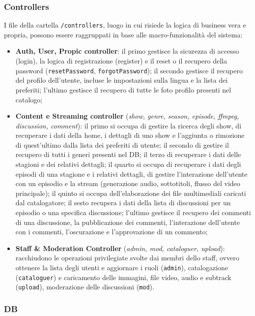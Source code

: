 \documentclass[11pt,a4paper]{article}
\begin{document}
\subsubsection{Controllers}
I file della cartella \texttt{/controllers}, luogo in cui risiede la logica di business vera e propria, possono essere raggruppati in base alle macro-funzionalità del sistema:
\begin{itemize}
    \item \textbf{Auth, User, Propic controller}: il primo gestisce la sicurezza di accesso (login), la logica di registrazione (register) e il reset o il recupero della password (\texttt{resetPassword}, \texttt{forgotPassword}); il secondo gestisce il recupero del profilo dell’utente, incluse le impostazioni sulla lingua e la lista dei preferiti; l’ultimo gestisce il recupero di tutte le foto profilo presenti nel catalogo;
    \item \textbf{Content e Streaming controller} (\textit{show, genre, season, episode, ffmpeg, discussion, comment}): il primo si occupa di gestire la ricerca degli show, di recuperare i dati della home, i dettagli di uno show e l’aggiunta o rimozione di quest’ultimo dalla lista dei preferiti di utente; il secondo di gestire il recupero di tutti i generi presenti nel DB; il terzo di recuperare i dati delle stagioni e dei relativi dettagli; il quarto si occupa di recuperare i dati degli episodi di una stagione e i relativi dettagli, di gestire l’interazione dell’utente con un episodio e la stream (generazione audio, sottotitoli, flusso del video principale); il quinto si occupa dell’elaborazione dei file multimediali caricati dal catalogatore; il sesto recupera i dati della lista di discussioni per un episodio o una specifica discussione; l’ultimo gestisce il recupero dei commenti di una discussione, la pubblicazione dei commenti, l’interazione dell’utente con i commenti, l’oscurazione e l’approvazione di un commento;
    \item \textbf{Staff \& Moderation Controller} (\textit{admin, mod, cataloguer, upload}): racchiudono le operazioni privilegiate svolte dai membri dello staff, ovvero ottenere la lista degli utenti e aggiornare i ruoli (\texttt{admin}), catalogazione (\texttt{cataloguer}) e caricamento delle immagini, file video, audio e subtrack (\texttt{upload}), moderazione delle discussioni (\texttt{mod}).
\end{itemize}

\subsubsection{DB}
\end{document}
